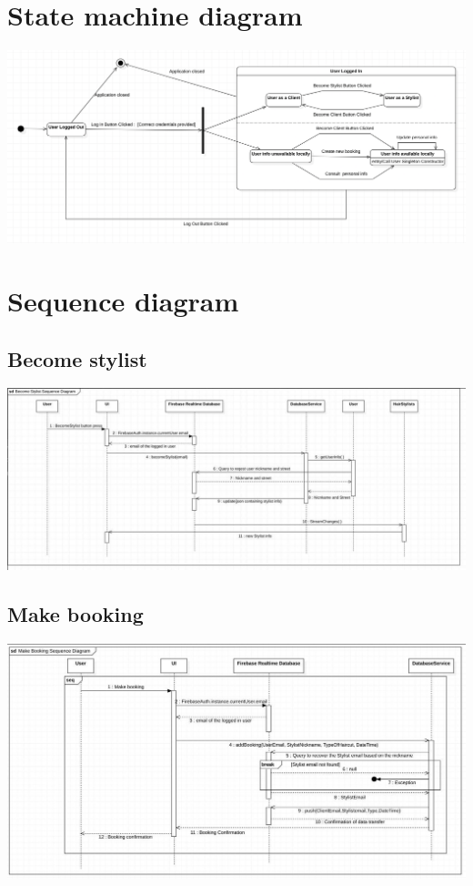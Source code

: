 \documentclass{article}
\begin{document}
\section{State machine diagram}
\includegraphics[scale = 0.5]{ImmaginiUML/StateMachineDiagram.png}
\newpage
\section{Sequence diagram}
\subsection{Become stylist}
\includegraphics[scale=0.45]{ImmaginiUML/Sequence1.jpg}
\subsection{Make booking}
\includegraphics[scale=0.4]{ImmaginiUML/Sequence2.jpg}
\end{document}
